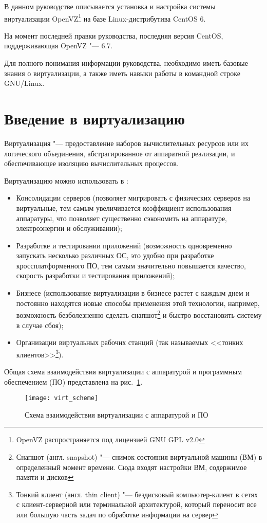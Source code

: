В данном руководстве описывается установка и настройка системы виртуализации OpenVZ\footnote{OpenVZ распространяется под лицензией GNU GPL v2.0} 
на базе Linux-дистрибутива CentOS 6.

На момент последней правки руководства, последняя версия CentOS, поддерживающая OpenVZ "--- 6.7.

Для полного понимания информации руководства, необходимо иметь базовые знания о виртуализации, а также иметь навыки работы в командной строке GNU/Linux.

\section{Введение в виртуализацию}

Виртуализация "--- предоставление наборов вычислительных ресурсов или их логического объединения, абстрагированное от аппаратной реализации, и обеспечивающее изоляцию вычислительных процессов. 

Виртуализацию можно использовать в \cite{sevconf2014}:
\begin{itemize}
    \item Консолидации серверов (позволяет мигрировать с физических серверов на виртуальные, тем самым увеличивается коэффициент использования аппаратуры, что позволяет существенно сэкономить на аппаратуре, электроэнергии и обслуживании);
    \item Разработке и тестировании приложений (возможность одновременно запускать несколько различных ОС, это удобно при разработке кроссплатформенного ПО, тем самым значительно повышается качество, скорость разработки и тестирования приложений);
    \item Бизнесе (использование виртуализации в бизнесе растет с каждым днем и постоянно находятся новые способы применения этой технологии, например, возможность безболезненно сделать снапшот\footnote{Снапшот (англ. snapshot) "--- снимок состояния виртуальной машины (ВМ) в определенный момент времени. Сюда входят настройки ВМ, содержимое памяти и дисков} и быстро восстановить систему в случае сбоя);
    \item Организации виртуальных рабочих станций (так называемых <<тонких клиентов>>\footnote{Тонкий клиент (англ. thin client) "--- бездисковый компьютер-клиент в сетях с клиент-серверной или терминальной архитектурой, который переносит все или большую часть задач по обработке информации на сервер}).
\end{itemize}

Общая схема взаимодействия виртуализации с аппаратурой и программным обеспечением (ПО) представлена на рис.~\ref{pic:virt_scheme}.
\begin{figure}[ht]
    \centering
	\texttt{[image: virt\_scheme]}
	\caption{Схема взаимодействия виртуализации с аппаратурой и ПО}\label{pic:virt_scheme}
\end{figure}

